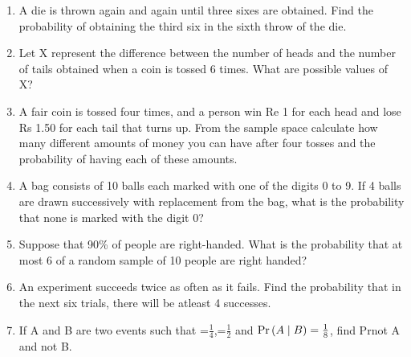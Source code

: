\begin{enumerate}[label=\thechapter.\arabic*,ref=\thechapter.\theenumi]
\item A die is thrown again and again until three sixes are obtained. Find the probability of obtaining the third six in the sixth throw of the die.
\item Let X represent the difference between the number of heads and the number of
tails obtained when a coin is tossed 6 times. What are possible values of X?
\item A fair coin is tossed four times, and a person win Re 1 for each head and lose
Rs 1.50 for each tail that turns up.
From the sample space calculate how many different amounts of money you can
have after four tosses and the probability of having each of these amounts.
\item A bag consists of 10 balls each marked with one of the digits 0 to 9. If 4 balls are drawn successively with replacement from the bag, what is the probability that none is marked with the digit 0?
\item Suppose that 90\% of people are right-handed. What is the probability that at most 6 of a random sample of 10 people are right handed?
\item An experiment succeeds twice as often as it fails. Find the probability that in the next six trials, there will be atleast 4 successes.
\item If A and B are two events such that =$\frac{1}{4}$,=$\frac{1}{2}$ and $\Pr\left( A\mid B\right)=\frac{1}{8}$,
find Pr{not A and not B}.
\end{enumerate}
